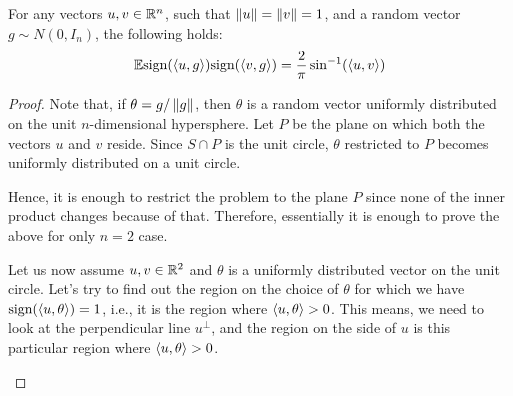 \documentclass[12pt]{article}
\begin{document}
\begin{lemmabox}
    For any vectors $u, v \in \mathbb{R}^n$, such that $\left\Vert u \right\Vert = \left\Vert v \right\Vert = 1$, and a random vector $g \sim N(0, I_n)$, the following holds:
    \begin{equation*}
        \mathbb{E} \text{sign}(\left\langle u, g \right\rangle)\text{sign}(\left\langle v, g \right\rangle) = \dfrac{2}{\pi}\sin^{-1}(\left\langle u, v \right\rangle)
    \end{equation*}
\end{lemmabox}
\begin{proof}
    Note that, if $\theta = g/\left\Vert g \right\Vert$, then $\theta$ is a random vector uniformly distributed on the unit $n$-dimensional hypersphere. Let $P$ be the plane on which both the vectors $u$ and $v$ reside. Since $S \cap P$ is the unit circle, $\theta$ restricted to $P$ becomes uniformly distributed on a unit circle.

    Hence, it is enough to restrict the problem to the plane $P$ since none of the inner product changes because of that. Therefore, essentially it is enough to prove the above for only $n = 2$ case.

    Let us now assume $u, v \in \mathbb{R}^2$ and $\theta$ is a uniformly distributed vector on the unit circle. Let's try to find out the region on the choice of $\theta$ for which we have $\text{sign}(\left\langle u, \theta \right\rangle) = 1$, i.e., it is the region where $\left\langle u, \theta \right\rangle > 0$. This means, we need to look at the perpendicular line $u^{\perp}$, and the region on the side of $u$ is this particular region where $\left\langle u,\theta \right\rangle > 0$. 

    \begin{figure}[h]
        \centering
    \end{figure}


\end{proof}
\end{document}
